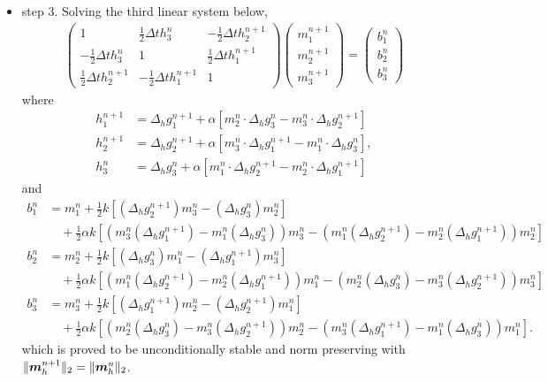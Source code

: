 \documentclass[preprint,times,3p]{elsarticle}
\def\m{\mbox{\boldmath $m$}}
\begin{document}
\begin{itemize}
\begin{align*}
\end{align*}
     \item step 3. Solving the third linear system below,
	\begin{align*}
	\begin{pmatrix}
	1&\frac12 \Delta t h_3^n&-\frac12 \Delta t h_2^{n+1}\\
	-\frac12 \Delta th_3^n&1&\frac12 \Delta th_1^{n+1}\\
	\frac12 \Delta th_2^{n+1}&-\frac12 \Delta th_1^{n+1}&1
	\end{pmatrix}\begin{pmatrix}
	m_1^{n+1}\\
	m_2^{n+1}\\
	m_3^{n+1}
	\end{pmatrix}=\begin{pmatrix}
	b_1^n\\
	b_2^n\\
	b_3^n
	\end{pmatrix}
	\end{align*}
            where 
    \begin{align*}
h_1^{n+1}&=\Delta_h g_1^{n+1}+\alpha \left[m_2^n \cdot \Delta_hg_3^{n}-m_3^n\cdot \Delta_h g_2^{n+1}\right]\\
h_2^{n+1}&=\Delta_h g_2^{n+1}+\alpha \left[m_3^n \cdot \Delta_hg_1^{n+1}-m_1^n\cdot \Delta_h g_3^{n}\right],\\
	h_3^n&=\Delta_h g_3^{n}+\alpha \left[m_1^n \cdot \Delta_hg_2^{n+1}-m_2^n\cdot \Delta_h g_1^{n+1}\right]
\end{align*}
and 
\begin{align*}
b_1^n&=m_1^n+\frac12 k [( \Delta_h g_2^{n+1})m_3^n-( \Delta_h g_3^{n})m_2^n]\\
&\quad+\frac12 \alpha k [(m_3^n(\Delta_h g_1^{n+1})-m_1^n(\Delta_h g_3^{n}))m_3^n-(m_1^n(\Delta_h g_2^{n+1})-m_2^n(\Delta_h g_1^{n+1}))m_2^n]\\
b_2^n&=m_2^n+\frac12 k [(\Delta_h g_3^{n})m_1^n-(\Delta_h g_1^{n+1})m_3^n]\\
&\quad+\frac12 \alpha k [(m_1^n(\Delta_h g_2^{n+1})-m_2^n(\Delta_h g_1^{n+1}))m_1^n-(m_2^n(\Delta_h g_3^{n})-m_3^n(\Delta_h g_2^{n+1}))m_3^n]\\
b_3^n&=m_3^n+\frac12 k [(\Delta_h g_1^{n+1})m_2^n-(\Delta_h g_2^{n+1})m_1^n]\\
&\quad+\frac12 \alpha k [(m_2^n(\Delta_h g_3^{n})-m_3^n(\Delta_h g_2^{n+1}))m_2^n-(m_3^n(\Delta_h g_1^{n+1})-m_1^n(\Delta_h g_3^{n}))m_1^n].
\end{align*}
    which is proved to be unconditionally stable and norm preserving with $\|\m_h^{n+1}\|_2=\|\m_h^n\|_2$.
    \end{itemize}
\end{document}
